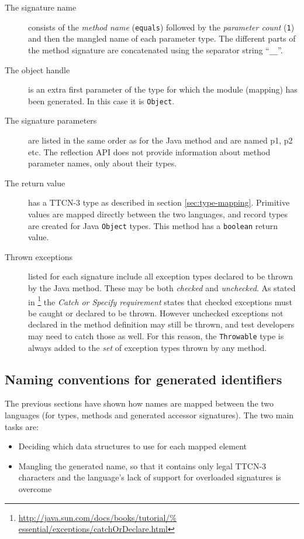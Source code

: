 \begin{description}
\item[The signature name] consists of
the \emph{method name} (\verb=equals=)
followed by the \emph{parameter count} (\verb=1=)
and then the mangled name of each parameter type.
The different parts of the method signature are concatenated using
the separator string ``\verb=__=''.
\item[The object handle] is an extra first parameter
of the type for which the module (mapping) has been generated.
In this case it is \verb=Object=.
\item[The signature parameters]
are listed in the same order as for the Java method
and are named p1, p2 etc.
The reflection \ac{API} does not provide information
about method parameter names, only about their types.
\item[The return value] has a \ac{TTCN-3} type
as described in section \ref{sec:type-mapping}.
Primitive values are mapped directly between the two languages,
and record types are created for Java \verb=Object= types.
This method has a \verb=boolean= return value.
\item[Thrown exceptions] listed for each signature
include all exception types declared to be thrown by the Java method.
These may be both \emph{checked} and \emph{unchecked}.
As stated in \citep{website:java-tutorial-exceptions}\footnote{\raggedright%
	\url{http://java.sun.com/docs/books/tutorial/%
	essential/exceptions/catchOrDeclare.html}}
the \emph{Catch or Specify requirement} states that
checked exceptions must be caught or declared to be thrown.
However unchecked exceptions not declared in the method definition
may still be thrown, and test developers may need to catch those as well.
For this reason, the \verb=Throwable= type is always added
to the \emph{set} of exception types thrown by any method.
\end{description}


\subsection{Naming conventions for generated identifiers}
\label{sec:description-naming-conventions}

The previous sections have shown how names are mapped between the two languages
(for types, methods and generated accessor signatures).
The two main tasks are:
\begin{itemize}
\item Deciding which data structures to use for each mapped element
\item Mangling the generated name,
so that it contains only legal \ac{TTCN-3} characters
and the language's lack of support for overloaded signatures is overcome
\end{itemize}

